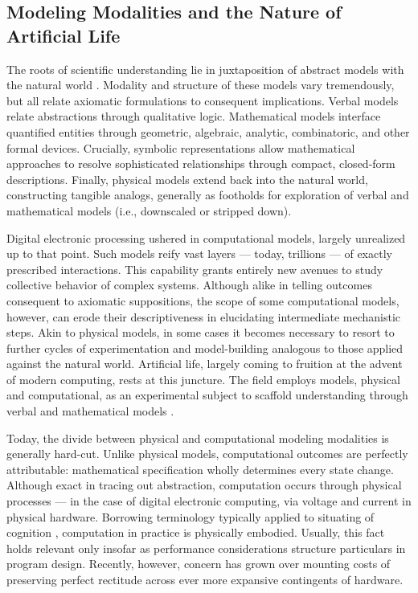 \subsection{Modeling Modalities and the Nature of Artificial Life}

The roots of scientific understanding lie in juxtaposition of abstract models with the natural world \citep{banzhaf2016defining}.
Modality and structure of these models vary tremendously, but all relate axiomatic formulations to consequent implications.
Verbal models relate abstractions through qualitative logic.
Mathematical models interface quantified entities through geometric, algebraic, analytic, combinatoric, and other formal devices.
Crucially, symbolic representations allow mathematical approaches to resolve sophisticated relationships through compact, closed-form descriptions.
Finally, physical models extend back into the natural world, constructing tangible analogs, generally as footholds for exploration of verbal and mathematical models (i.e., downscaled or stripped down).

Digital electronic processing ushered in computational models, largely unrealized up to that point. 
Such models reify vast layers --- today, trillions --- of exactly prescribed interactions.
This capability grants entirely new avenues to study collective behavior of complex systems.
Although alike in telling outcomes consequent to axiomatic suppositions, the scope of some computational models, however, can erode their descriptiveness in elucidating intermediate mechanistic steps.
Akin to physical models, in some cases it becomes necessary to resort to further cycles of experimentation and model-building analogous to those applied against the natural world.
Artificial life, largely coming to fruition at the advent of modern computing, rests at this juncture.
The field employs models, physical and computational, as an experimental subject to scaffold understanding through verbal and mathematical models \citep{bedau2003artificial}.

Today, the divide between physical and computational modeling modalities is generally hard-cut.
Unlike physical models, computational outcomes are perfectly attributable: mathematical specification wholly determines every state change.
Although exact in tracing out abstraction, computation occurs through physical processes --- in the case of digital electronic computing, via voltage and current in physical hardware.
Borrowing terminology typically applied to situating of cognition \citep{etxeberria1998embodiment}, computation in practice is physically embodied.
Usually, this fact holds relevant only insofar as performance considerations structure particulars in program design.
Recently, however, concern has grown over mounting costs of preserving perfect rectitude across ever more expansive contingents of hardware.

